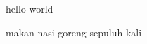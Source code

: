 \documentclass{article}
\begin{document}
  hello world
  
  makan nasi goreng sepuluh kali
  
\end{document}
